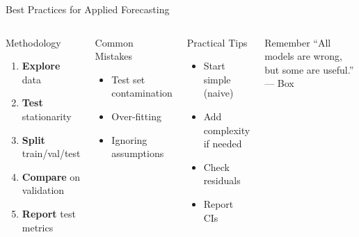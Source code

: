 \documentclass[9pt, aspectratio=169, t]{beamer}
\begin{document}
\begin{frame}{Best Practices for Applied Forecasting}
    \footnotesize
    \begin{columns}[T]
        \begin{block}{Methodology}
            \begin{enumerate}\setlength{\itemsep}{0pt}
                \item \textbf{Explore} data
                \item \textbf{Test} stationarity
                \item \textbf{Split} train/val/test
                \item \textbf{Compare} on validation
                \item \textbf{Report} test metrics
            \end{enumerate}
        \end{block}

        \begin{alertblock}{Common Mistakes}
            \begin{itemize}\setlength{\itemsep}{0pt}
                \item Test set contamination
                \item Over-fitting
                \item Ignoring assumptions
            \end{itemize}
        \end{alertblock}

        \begin{exampleblock}{Practical Tips}
            \begin{itemize}\setlength{\itemsep}{0pt}
                \item Start simple (naive)
                \item Add complexity if needed
                \item Check residuals
                \item Report CIs
            \end{itemize}
        \end{exampleblock}

        \begin{block}{Remember}
            ``All models are wrong, but some are useful.'' --- Box
        \end{block}
    \end{columns}
\end{frame}
\end{document}
